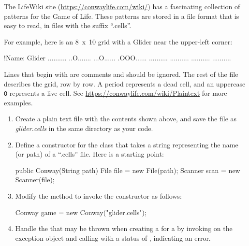 \begin{exercise}

The LifeWiki site (\url{https://conwaylife.com/wiki/}) has a fascinating collection of patterns for the Game of Life.
These patterns are stored in a file format that is easy to read, in files with the suffix ``.cells''.

For example, here is an \mbox{8 x 10} grid with a Glider near the upper-left corner:

\begin{stdout}
!Name: Glider
..........
..O.......
...O......
.OOO......
..........
..........
..........
..........
\end{stdout}

Lines that begin with \java{!} are comments and should be ignored.
The rest of the file describes the grid, row by row.
A period represents a dead cell, and an uppercase {\tt O} represents a live cell.
See \url{https://conwaylife.com/wiki/Plaintext} for more examples.

\begin{enumerate}

\item Create a plain text file with the contents shown above, and save the file as {\it glider.cells} in the same directory as your code.


\item Define a constructor for the  class that takes a string representing the name (or path) of a ``.cells'' file.
Here is a starting point:

\begin{code}
public Conway(String path) {
    File file = new File(path);
    Scanner scan = new Scanner(file);
}
\end{code}

\item Modify the  method to invoke the constructor as follows:

\begin{code}
Conway game = new Conway("glider.cells");
\end{code}

\item Handle the  that may be thrown when creating a  for a  by invoking  on the exception object and calling  with a status of , indicating an error.


\end{enumerate}
\end{exercise}
